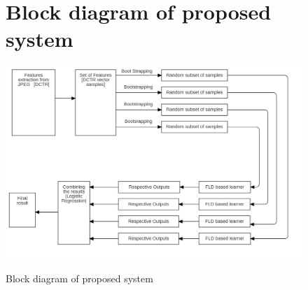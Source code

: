 \begin{figure}[H]
\section{Block diagram of proposed system}
\includegraphics[width=1.1\textwidth]{./img/block_d.jpg}\\
\caption{ Block diagram of proposed system}
\end{figure}
\clearpage

